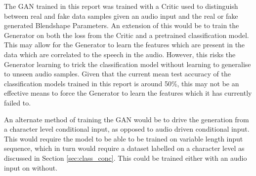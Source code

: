 The GAN trained in this report was trained with a Critic used to distinguish between real and fake data samples given an audio input and the real or fake generated Blendshape Parameters.
An extension of this would be to train the Generator on both the loss from the Critic and a pretrained classification model.
This may allow for the Generator to learn the features which are present in the data which are correlated to the speech in the audio.
However, this risks the Generator learning to trick the classification model without learning to generalise to unseen audio samples.
Given that the current mean test accuracy of the classification models trained in this report is around 50\%, this may not be an effective means to force the Generator to learn the features which it has currently failed to.

An alternate method of training the GAN would be to drive the generation from a character level conditional input, as opposed to audio driven conditional input.
This would require the model to be able to be trained on variable length input sequence, which in turn would require a dataset labelled on a character level as discussed in Section \ref{sec:class_conc}.
This could be trained either with an audio input on without.
